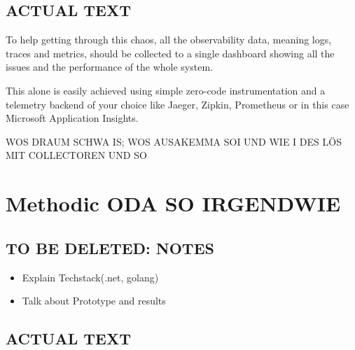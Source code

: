 \subsection{ACTUAL TEXT}

To help getting through this chaos, all the observability data, meaning logs, traces and metrics, should be
collected to a single dashboard showing all the issues and the performance of the whole system.

This alone is easily achieved using simple zero-code instrumentation and a telemetry backend of your choice
like Jaeger, Zipkin, Prometheus or in this case Microsoft Application Insights.

WOS DRAUM SCHWA IS; WOS AUSAKEMMA SOI UND WIE I DES LÖS MIT COLLECTOREN UND SO

\section{Methodic ODA SO IRGENDWIE}

\subsection{TO BE DELETED: NOTES}

\begin{itemize}
	\item Explain Techstack(.net, golang)
	\item Talk about Prototype and results
\end{itemize}

\subsection{ACTUAL TEXT}
